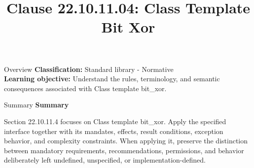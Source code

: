 \documentclass[10pt,letterpaper]{article}
\title{Clause 22.10.11.04: Class Template Bit Xor}
\author{}
\date{}
\begin{document}
\maketitle
\begin{CornellOverviewBox}{Overview}
\textbf{Classification:} Standard library - Normative\\[2pt]
\textbf{Learning objective:} Understand the rules, terminology, and semantic consequences associated with Class template bit\_xor.
\end{CornellOverviewBox}\begin{CornellSummaryBox}{Summary}
{\sffamily\bfseries\color{Accent} Summary}\par\vspace{3pt}Section 22.10.11.4 focuses on Class template bit\_xor. Apply the specified interface together with its mandates, effects, result conditions, exception behavior, and complexity constraints. When applying it, preserve the distinction between mandatory requirements, recommendations, permissions, and behavior deliberately left undefined, unspecified, or implementation-defined.
\end{CornellSummaryBox}
\end{document}
